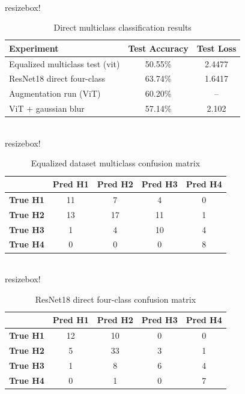 \begin{table}[H]
\centering
\\resizebox{\textwidth}{!}{%
\begin{tabular}{lcc}
\toprule
\textbf{Experiment} & \textbf{Test Accuracy} & \textbf{Test Loss} \\
\midrule
Equalized multiclass test (vit) & 50.55\% & 2.4477 \\
ResNet18 direct four-class & 63.74\% & 1.6417 \\
Augmentation run (ViT) & 60.20\% & -- \\
ViT + gaussian blur & 57.14\% & 2.102 \\
\bottomrule
\end{tabular}}
\caption{Direct multiclass classification results}
\label{tab:direct_multiclass}
\end{table}

\begin{table}[H]
\centering
\scriptsize
\\resizebox{\textwidth}{!}{%
\begin{tabular}{lcccc}
\toprule
 & \textbf{Pred H1} & \textbf{Pred H2} & \textbf{Pred H3} & \textbf{Pred H4} \\
\midrule
\textbf{True H1} & 11 & 7 & 4 & 0 \\
\textbf{True H2} & 13 & 17 & 11 & 1 \\
\textbf{True H3} & 1 & 4 & 10 & 4 \\
\textbf{True H4} & 0 & 0 & 0 & 8 \\
\bottomrule
\end{tabular}}
\caption{Equalized dataset multiclass confusion matrix}
\label{tab:equalized_cm}
\end{table}

\begin{table}[H]
\centering
\scriptsize
\\resizebox{\textwidth}{!}{%
\begin{tabular}{lcccc}
\toprule
 & \textbf{Pred H1} & \textbf{Pred H2} & \textbf{Pred H3} & \textbf{Pred H4} \\
\midrule
\textbf{True H1} & 12 & 10 & 0 & 0 \\
\textbf{True H2} & 5 & 33 & 3 & 1 \\
\textbf{True H3} & 1 & 8 & 6 & 4 \\
\textbf{True H4} & 0 & 1 & 0 & 7 \\
\bottomrule
\end{tabular}}
\caption{ResNet18 direct four-class confusion matrix}
\label{tab:resnet_direct_cm}
\end{table}

